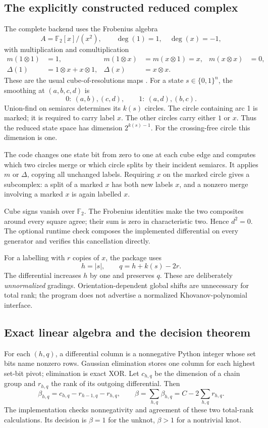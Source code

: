 \documentclass[11pt]{article}
\theoremstyle{remark}\newtheorem{remark}[theorem]{Remark}
\newcommand{\F}{\mathbb F_2}
\begin{document}
\subsection{The explicitly constructed reduced complex}
The complete backend uses the Frobenius algebra
\[
 A=\F[x]/(x^2),\qquad \deg(1)=1,\quad\deg(x)=-1,
\]
with multiplication and comultiplication
\begin{align*}
 m(1\otimes1)&=1,&m(1\otimes x)&=m(x\otimes1)=x,&m(x\otimes x)&=0,\\
 \Delta(1)&=1\otimes x+x\otimes1,&\Delta(x)&=x\otimes x.
\end{align*}
These are the usual cube-of-resolutions maps \cite{khovanov,barnatan}.
For a state $s\in\{0,1\}^n$, the smoothing at $(a,b,c,d)$ is
\[
 0:\ (a,b),(c,d),\qquad 1:\ (a,d),(b,c).
\]
Union-find on semiarcs determines its $k(s)$ circles. The circle containing arc
1 is marked; it is required to carry label $x$. The other circles carry either
$1$ or $x$. Thus the reduced state space has dimension $2^{k(s)-1}$.
For the crossing-free circle this dimension is one.

The code changes one state bit from zero to one at each cube edge and computes
which two circles merge or which circle splits by their incident semiarcs.
It applies $m$ or $\Delta$, copying all unchanged labels. Requiring $x$ on the
marked circle gives a subcomplex: a split of a marked $x$ has both new labels
$x$, and a nonzero merge involving a marked $x$ is again labelled $x$.

Cube signs vanish over $\F$. The Frobenius identities make the two composites
around every square agree; their sum is zero in characteristic two. Hence
$d^2=0$. The optional runtime check composes the implemented differential on
every generator and verifies this cancellation directly.

For a labelling with $r$ copies of $x$, the package uses
\[
 h=|s|,\qquad q=h+k(s)-2r.
\]
The differential increases $h$ by one and preserves $q$. These are deliberately
\emph{unnormalized} gradings. Orientation-dependent global shifts are
unnecessary for total rank; the program does not advertise a normalized
Khovanov-polynomial interface.

\subsection{Exact linear algebra and the decision theorem}
For each $(h,q)$, a differential column is a nonnegative Python integer whose
set bits name nonzero rows. Gaussian elimination stores one column for each
highest set-bit pivot; elimination is exact XOR. Let $c_{h,q}$ be the dimension
of a chain group and $r_{h,q}$ the rank of its outgoing differential. Then
\[
 \beta_{h,q}=c_{h,q}-r_{h-1,q}-r_{h,q},\qquad
 \beta=\sum_{h,q}\beta_{h,q}=C-2\sum_{h,q}r_{h,q}.
\]
The implementation checks nonnegativity and agreement of these two total-rank
calculations. Its decision is $\beta=1$ for the unknot, $\beta>1$ for a
nontrivial knot.
\end{document}
